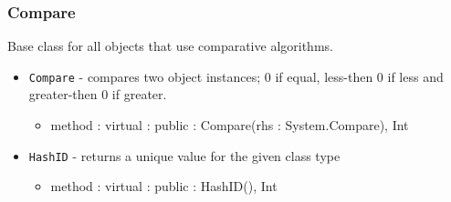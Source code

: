 \documentclass[12pt]{article}
\begin{document}
\subsubsection{Compare}
Base class for all objects that use comparative algorithms.
\begin{itemize}
    \item \texttt{Compare} - compares two object instances; 0 if equal, less-then 0 if less and greater-then 0 if greater. 
    	\begin{itemize}
	\item method : virtual : public : Compare(rhs : System.Compare), Int
	\end{itemize}
   \item \texttt{HashID} - returns a unique value for the given class type
    	\begin{itemize}
	\item method : virtual : public : HashID(), Int
	\end{itemize}	
\end{itemize}
\end{document}
